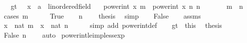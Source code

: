 \begin{isabellebody}
\ \ \ gt{}{\isacharcolon}{\kern0pt}\ {\isachardoublequoteopen}{}\ {\isacharless}{\kern0pt}\ {\isacharparenleft}{\kern0pt}x\ {\isacharcolon}{\kern0pt}{\isacharcolon}{\kern0pt}\ {\isacharprime}{\kern0pt}a\ {\isacharcolon}{\kern0pt}{\isacharcolon}{\kern0pt}\ linordered{\isacharunderscore}{\kern0pt}field{\isacharparenright}{\kern0pt}{\isachardoublequoteclose}\isanewline
\ \ \ {\isachardoublequoteopen}power{\isacharunderscore}{\kern0pt}int\ x\ m\ {\isasymle}\ power{\isacharunderscore}{\kern0pt}int\ x\ n{\isachardoublequoteclose}\ {\isachardoublequoteopen}n\ {\isasymge}\ {}{\isachardoublequoteclose}\isanewline
\ \ \ \ \ {\isachardoublequoteopen}m\ {\isasymle}\ n{\isachardoublequoteclose}\isanewline
%
\isadelimproof
%
\endisadelimproof
%
\isatagproof
{}\isamarkupfalse%
\ {\isacharparenleft}{\kern0pt}cases\ {\isachardoublequoteopen}m\ {\isacharless}{\kern0pt}\ {}{\isachardoublequoteclose}{\isacharparenright}{\kern0pt}\isanewline
\ \ \isamarkupfalse%
\ True\isanewline
\ \ \isamarkupfalse%
\ {\isacartoucheopen}n\ {\isasymge}\ {}{\isacartoucheclose}\ \isamarkupfalse%
\ {\isacharquery}{\kern0pt}thesis\ \isamarkupfalse%
\ simp\isanewline
{}\isamarkupfalse%
\isanewline
\ \ \isamarkupfalse%
\ False\isanewline
\ \ \isamarkupfalse%
\ assms\ \isamarkupfalse%
\ {\isachardoublequoteopen}x\ {\isacharcircum}{\kern0pt}\ nat\ m\ {\isasymle}\ x\ {\isacharcircum}{\kern0pt}\ nat\ n{\isachardoublequoteclose}\isanewline
\ \ \ \ \isamarkupfalse%
\ {\isacharparenleft}{\kern0pt}simp\ add{\isacharcolon}{\kern0pt}\ power{\isacharunderscore}{\kern0pt}int{\isacharunderscore}{\kern0pt}def{\isacharparenright}{\kern0pt}\isanewline
\ \ \isamarkupfalse%
\ gt{}\ \ this\ \isamarkupfalse%
\ {\isacharquery}{\kern0pt}thesis\isanewline
\ \ \ \ \isamarkupfalse%
\ False\ {\isacartoucheopen}n\ {\isasymge}\ {}{\isacartoucheclose}\ \isamarkupfalse%
\ auto\isanewline
{}\isamarkupfalse%
%
\endisatagproof
{\isafoldproof}%
%
\isadelimproof
\isanewline
%
\endisadelimproof
\isanewline
{}\isamarkupfalse%
\ power{\isacharunderscore}{\kern0pt}int{\isacharunderscore}{\kern0pt}le{\isacharunderscore}{\kern0pt}imp{\isacharunderscore}{\kern0pt}less{\isacharunderscore}{\kern0pt}exp{\isacharcolon}{\kern0pt}\isanewline

\end{isabellebody}
